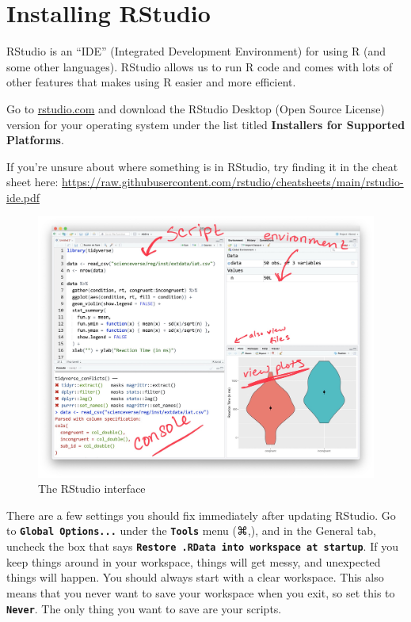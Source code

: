 \documentclass[
]{article}
\begin{document}
\hypertarget{installing-rstudio}{%
\section{Installing RStudio}\label{installing-rstudio}}

RStudio is an ``IDE'' (Integrated Development Environment) for using R
(and some other languages). RStudio allows us to run R code and comes
with lots of other features that makes using R easier and more
efficient.

Go to
\href{https://www.rstudio.com/products/rstudio/download/\#download}{rstudio.com}
and download the RStudio Desktop (Open Source License) version for your
operating system under the list titled \textbf{Installers for Supported
Platforms}.

If you're unsure about where something is in RStudio, try finding it in
the cheat sheet here:
\url{https://raw.githubusercontent.com/rstudio/cheatsheets/main/rstudio-ide.pdf}

\begin{figure}
\includegraphics[width=500px]{images/paste-B4148C41} \caption{The RStudio interface}\label{fig:unnamed-chunk-2}
\end{figure}

There are a few settings you should fix immediately after updating
RStudio. Go to \textbf{\texttt{Global\ Options...}} under the
\textbf{\texttt{Tools}} menu (⌘,), and in the General tab, uncheck the
box that says
\textbf{\texttt{Restore\ .RData\ into\ workspace\ at\ startup}}. If you
keep things around in your workspace, things will get messy, and
unexpected things will happen. You should always start with a clear
workspace. This also means that you never want to save your workspace
when you exit, so set this to \textbf{\texttt{Never}}. The only thing
you want to save are your scripts.
\end{document}

